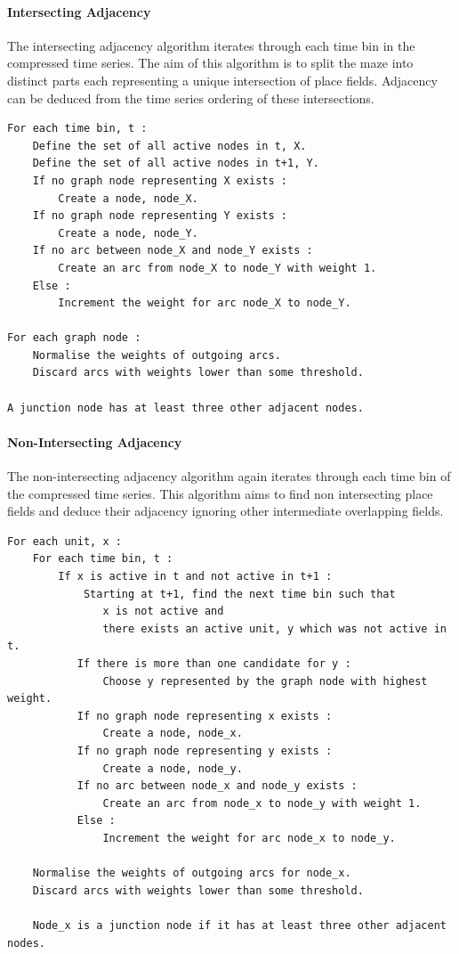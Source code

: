 \documentclass[11pt]{report}
\begin{document}
\paragraph{Intersecting Adjacency}
The intersecting adjacency algorithm iterates through each time bin in the compressed time series. The aim of this algorithm is to split the maze into distinct parts each representing a unique intersection of place fields. Adjacency can be deduced from the time series ordering of these intersections.

\begin{lstlisting}
For each time bin, t :
	Define the set of all active nodes in t, X.
	Define the set of all active nodes in t+1, Y.
	If no graph node representing X exists : 
		Create a node, node_X.
	If no graph node representing Y exists : 
		Create a node, node_Y.
	If no arc between node_X and node_Y exists : 
		Create an arc from node_X to node_Y with weight 1.
	Else : 
		Increment the weight for arc node_X to node_Y.
 
For each graph node :
	Normalise the weights of outgoing arcs.
	Discard arcs with weights lower than some threshold.
 
A junction node has at least three other adjacent nodes.
\end{lstlisting}

\paragraph{Non-Intersecting Adjacency}
The non-intersecting adjacency algorithm again iterates through each time bin of the compressed time series. This algorithm aims to find non intersecting place fields and deduce their adjacency ignoring other intermediate overlapping fields.\\

\begin{lstlisting}
For each unit, x :
    For each time bin, t :
        If x is active in t and not active in t+1 :
            Starting at t+1, find the next time bin such that 
               x is not active and 
               there exists an active unit, y which was not active in t.
           If there is more than one candidate for y :
               Choose y represented by the graph node with highest weight.
           If no graph node representing x exists : 
               Create a node, node_x.
           If no graph node representing y exists : 
               Create a node, node_y.
           If no arc between node_x and node_y exists : 
               Create an arc from node_x to node_y with weight 1.
           Else : 
               Increment the weight for arc node_x to node_y.
	
    Normalise the weights of outgoing arcs for node_x.
    Discard arcs with weights lower than some threshold.
 
    Node_x is a junction node if it has at least three other adjacent nodes.		
\end{lstlisting}
\end{document}

